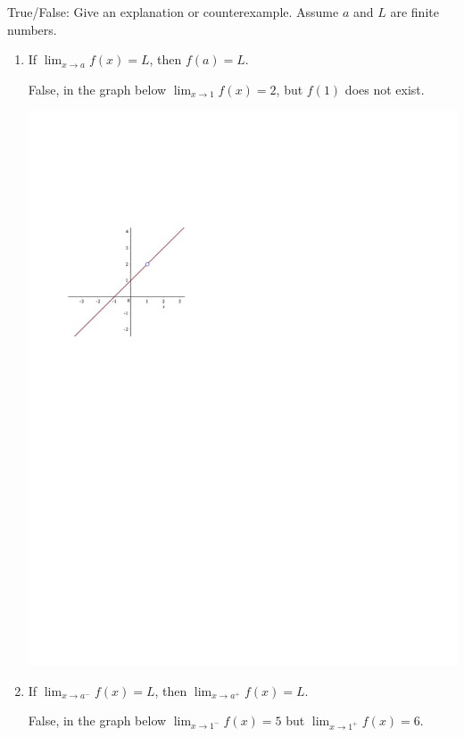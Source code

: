 \documentclass[nooutcomes]{ximera}
\begin{document}
	
	
	
	
\begin{problem}
True/False:  Give an explanation or counterexample.  Assume $a$ and $L$ are finite numbers.
	
			\begin{enumerate}
			
			\item  If $ \lim_{x \to a} f(x) = L$, then $f(a) = L$.
			\begin{freeResponse}
			False, in the graph below $ \lim_{x \to 1} f(x) = 2 $, but $f(1)$ does not exist.
			
				\begin{image}
				\includegraphics[trim= 70 470 250 160]{Figure5.pdf}
				\end{image}
			\end{freeResponse}
			
			
			
			\item  If $  \lim_{x \to a^-} f(x) = L$, then $  \lim_{x \to a^+} f(x) = L $.
			\begin{freeResponse}
			False, in the graph below $ \lim_{x \to 1^-} f(x) = 5$ but $ \lim_{x \to 1^+} f(x) = 6$.
			

\end{freeResponse}
\end{enumerate}
\end{problem}
\end{document}
